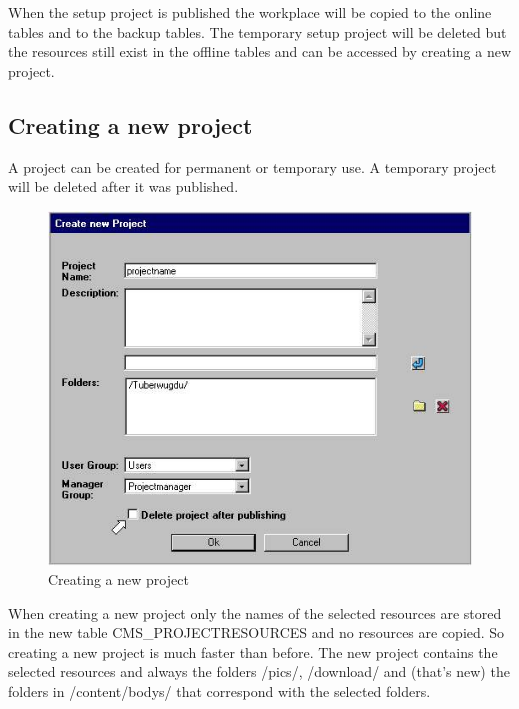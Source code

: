 When the setup project is published the workplace will be copied
to the online tables and to the backup tables. The temporary setup
project will be deleted but the resources still exist in the
offline tables and can be accessed by creating a new project.

\subsection{Creating a new project}

A project can be created for permanent or temporary use. A
temporary project will be deleted after it was published.

\begin{figure}[hbt]
\begin{center}
\includegraphics[width=\sgw]
                   {pics/newProject/newPro01}
\caption[Creating a new project]
           {Creating a new project}
\label{newproject}
\end{center}
\end{figure}

When creating a new project only the names of the selected
resources are stored in the new table CMS\_PROJECTRESOURCES and no
resources are copied. So creating a new project is much faster
than before. The new project contains the selected resources and
always the folders /pics/, /download/ and (that's new) the folders
in /content/bodys/ that correspond with the selected folders.

